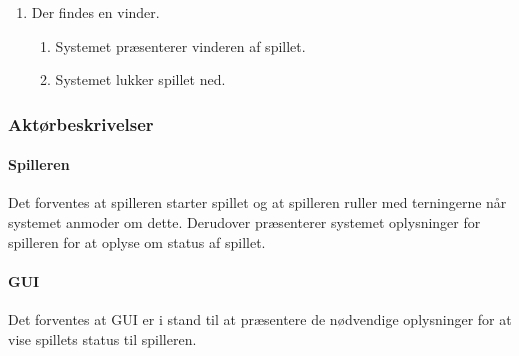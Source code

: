 \begin{enumerate}[8a.]
\item Der findes en vinder.
	\begin{enumerate}[1.]
	\item Systemet præsenterer vinderen af spillet.
	\item Systemet lukker spillet ned.
	\end{enumerate}
\end{enumerate}

\subsubsection{Aktørbeskrivelser}

\paragraph{Spilleren} Det forventes at spilleren starter spillet og at spilleren ruller med terningerne når systemet anmoder om dette. Derudover præsenterer systemet oplysninger for spilleren for at oplyse om status af spillet.

\paragraph{GUI} Det forventes at GUI er i stand til at præsentere de nødvendige oplysninger for at vise spillets status til spilleren.
